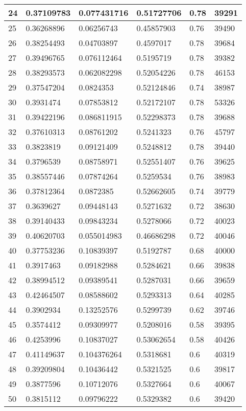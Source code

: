 \begin{longtable}{|l|l|l|l|l|l|}
24 & 0.37109783 & 0.077431716 & 0.51727706 & 0.78 & 39291 \\ \hline 
25 & 0.36268896 & 0.06256743 & 0.45857903 & 0.76 & 39490 \\ \hline 
26 & 0.38254493 & 0.04703897 & 0.4597017 & 0.78 & 39684 \\ \hline 
27 & 0.39496765 & 0.076112464 & 0.5195719 & 0.78 & 39382 \\ \hline 
28 & 0.38293573 & 0.062082298 & 0.52054226 & 0.78 & 46153 \\ \hline 
29 & 0.37547204 & 0.0824353 & 0.52124846 & 0.74 & 38987 \\ \hline 
30 & 0.3931474 & 0.07853812 & 0.52172107 & 0.78 & 53326 \\ \hline 
31 & 0.39422196 & 0.086811915 & 0.52298373 & 0.78 & 39688 \\ \hline 
32 & 0.37610313 & 0.08761202 & 0.5241323 & 0.76 & 45797 \\ \hline 
33 & 0.3823819 & 0.09121409 & 0.5248812 & 0.78 & 39440 \\ \hline 
34 & 0.3796539 & 0.08758971 & 0.52551407 & 0.76 & 39625 \\ \hline 
35 & 0.38557446 & 0.07874264 & 0.5259534 & 0.76 & 38983 \\ \hline 
36 & 0.37812364 & 0.0872385 & 0.52662605 & 0.74 & 39779 \\ \hline 
37 & 0.3639627 & 0.09448143 & 0.5271632 & 0.72 & 38630 \\ \hline 
38 & 0.39140433 & 0.09843234 & 0.5278066 & 0.72 & 40023 \\ \hline 
39 & 0.40620703 & 0.055014983 & 0.46686298 & 0.72 & 40046 \\ \hline 
40 & 0.37753236 & 0.10839397 & 0.5192787 & 0.68 & 40000 \\ \hline 
41 & 0.3917463 & 0.09182988 & 0.5284621 & 0.66 & 39838 \\ \hline 
42 & 0.38994512 & 0.09389541 & 0.5287031 & 0.66 & 39659 \\ \hline 
43 & 0.42464507 & 0.08588602 & 0.5293313 & 0.64 & 40285 \\ \hline 
44 & 0.3902934 & 0.13252576 & 0.5299739 & 0.62 & 39746 \\ \hline 
45 & 0.3574412 & 0.09309977 & 0.5208016 & 0.58 & 39395 \\ \hline 
46 & 0.4253996 & 0.10837027 & 0.53062654 & 0.58 & 40426 \\ \hline 
47 & 0.41149637 & 0.104376264 & 0.5318681 & 0.6 & 40319 \\ \hline 
48 & 0.39209804 & 0.10436442 & 0.5321525 & 0.6 & 39817 \\ \hline 
49 & 0.3877596 & 0.10712076 & 0.5327664 & 0.6 & 40067 \\ \hline 
50 & 0.3815112 & 0.09796222 & 0.5329382 & 0.6 & 39420 \\ \hline 
\end{longtable}